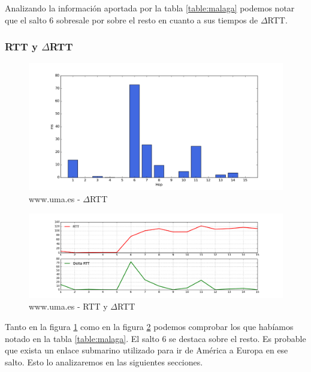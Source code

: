 Analizando la información aportada por la tabla \ref{table:malaga} podemos notar que el salto 6 sobresale por sobre el resto en cuanto a sus tiempos de $\Delta$RTT. 

\subsubsection{RTT y $\Delta$RTT}

\begin{figure}[H]
    \begin{center}
        \includegraphics[width=1\textwidth]{data/rtt-malaga-bar.png}
        \caption{www.uma.es - $\Delta$RTT}
        \label{histo:malaga}
    \end{center}
\end{figure}

\begin{figure}[H]
    \begin{center}
        \includegraphics[width=1\textwidth]{data/rtt-malaga-lines.png}
        \caption{www.uma.es - RTT y $\Delta$RTT}
        \label{lines:malaga}
    \end{center}
\end{figure}

Tanto en la figura \ref{histo:malaga} como en la figura \ref{lines:malaga} podemos comprobar los que habíamos notado en la tabla \ref{table:malaga}. El salto 6 se destaca sobre el resto. Es probable que exista un enlace submarino utilizado para ir de América a Europa en ese salto. Esto lo analizaremos en las siguientes secciones.

